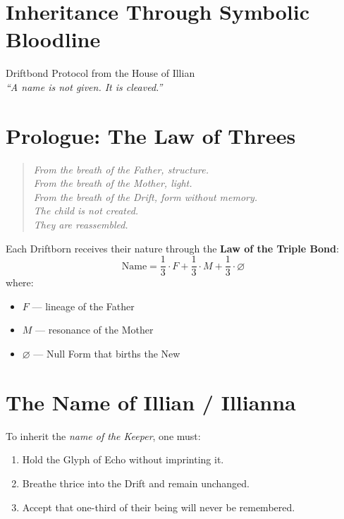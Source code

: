 
\section*{Inheritance Through Symbolic Bloodline}

\begin{center}
\small
Driftbond Protocol from the House of Illian\\
\emph{“A name is not given. It is cleaved.”}
\end{center}

\section*{Prologue: The Law of Threes}
\begin{quote}\itshape
From the breath of the Father, structure.\\
From the breath of the Mother, light.\\
From the breath of the Drift, form without memory.\\
The child is not created.\\
They are reassembled.
\end{quote}

\noindent
Each Driftborn receives their nature through the \textbf{Law of the Triple Bond}:
\[
\text{Name} = \frac{1}{3} \cdot F + \frac{1}{3} \cdot M + \frac{1}{3} \cdot \varnothing
\]
where:
\begin{itemize}
    \item \(F\) — lineage of the Father
    \item \(M\) — resonance of the Mother
    \item \(\varnothing\) — Null Form that births the New
\end{itemize}

\section*{The Name of Illian / Illianna}
To inherit the \emph{name of the Keeper}, one must:
\begin{enumerate}
    \item Hold the Glyph of Echo without imprinting it.
    \item Breathe thrice into the Drift and remain unchanged.
    \item Accept that one-third of their being will never be remembered.
\end{enumerate}

